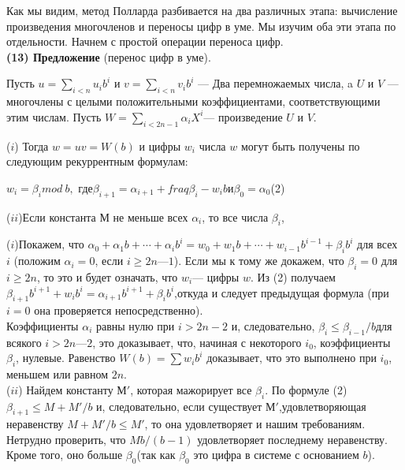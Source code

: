 \documentclass{mai_book}
\begin{document}
Как мы видим, метод Полларда разбивается на два различных этапа: вычисление произведения многочленов и переносы цифр в уме. Мы изучим оба эти этапа по отдельности. Начнем с простой операции переноса цифр. \\
\textbf{(13) Предложение} (перенос цифр в уме).\par
  Пусть $u = \sum_{i<n}u_{i}b^{i}$ и $v = \sum_{i < n}v_{i}b^{i}$ --- Два перемножаемых числа, a $U$ и $V$ — многочлены с целыми положительными коэффициентами, соответствующими этим числам. Пусть $W =\sum_{i<2n-1} \alpha_{i}X^{i}$--- произведение $U$ и $V$.\par
 ($i$) Тогда $w = uv = W(b)$ и цифры $w_{i}$ числа $w$ могут быть получены
по следующим рекуррентным формулам: 
\begin{center}
$w_{i} = \beta_{i}mod\ b, $ \quad где\quad $\beta_{i+1} = \alpha_{i+1} + fraq{\beta_{i}-w_{i}}{b}$\enskip и\enskip $\beta_0 = \alpha_{0}$\quad (2)
\end{center}
\pagebreak
\newpage


($ii$)Если константа М не меньше всех $\alpha_{i}$, то все числа $\beta_{i}$,

\begin{myproof}
($i$)Покажем, что $\alpha_0 + \alpha_{1}b + \cdots + \alpha_{i}b^{i} = w_{0} + w_{1}b + \cdots + w_{i-1}b^{i-1}+ \beta_{i}b^{i}$
для всех $i$ (положим $\alpha_{i} = 0$, если $ i \geq 2n — 1$). Если мы к тому же докажем, что $\beta_{i} = 0$ для $i \geq 2n$, то это и будет означать, что $w_{i}$--- цифры $w$. Из (2) получаем $\beta_{i+1}b^{i+1} + w_{i}b^{i} = \alpha_{i+1}b^{i+1} + \beta_{i}b^{i}$,откуда и следует предыдущая формула (при $i = 0$ она проверяется непосредственно). \\ 
Коэффициенты $\alpha_{i}$ равны нулю при $i > 2n - 2$ и, следовательно,
$\beta_{i} \leq \beta_{i-1}/b$для всякого $i > 2n — 2$, это доказывает, что, начиная с некоторого $i_{0}$, коэффициенты $\beta_{i}$, нулевые. Равенство $W(b) =\sum w_{i}b^{i}$ доказывает, что это выполнено при $i_0$, меньшем или равном $2n$. \\
($ii$) Найдем константу $М'$, которая мажорирует все $\beta_{i}$. По 
формуле (2) $\beta_{i+1} \leq M + M'/b$ и, следовательно, если существует $М'$,удовлетворяющая неравенству $M + M'/b \leq M'$, то она 
удовлетворяет и нашим требованиям. Нетрудно проверить, что $Mb/(b-1)$ удовлетворяет последнему неравенству. Кроме того, оно больше $\beta_{0}$(так как $\beta_{0}$ это цифра в системе с основанием $b$). 
\end{myproof}
\end{document}
